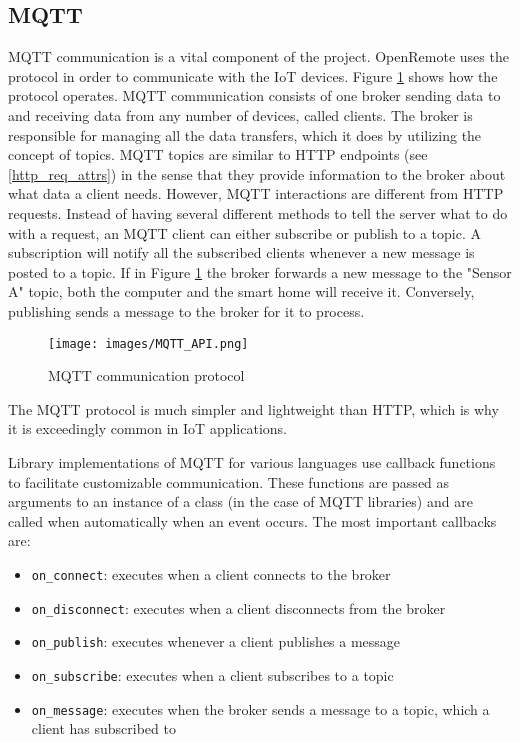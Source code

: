 \subsection{MQTT}
MQTT communication is a vital component of the project. OpenRemote uses the protocol in order to communicate with the IoT devices. Figure \ref{fig:mqtt_api} shows how the protocol operates. MQTT communication consists of one broker sending data to and receiving data from any number of devices, called clients. The broker is responsible for managing all the data transfers, which it does by utilizing the concept of topics. MQTT topics are similar to HTTP endpoints (see \ref{http_req_attrs}) in the sense that they provide information to the broker about what data a client needs. However, MQTT interactions are different from HTTP requests. Instead of having several different methods to tell the server what to do with a request, an MQTT client can either subscribe or publish to a topic. A subscription will notify all the subscribed clients whenever a new message is posted to a topic. If in Figure \ref{fig:mqtt_api} the broker forwards a new message to the "Sensor A" topic, both the computer and the smart home will receive it. Conversely, publishing sends a message to the broker for it to process.

\begin{figure}[ht]
    \centering
    \texttt{[image: images/MQTT\_API.png]}
    \caption{MQTT communication protocol}
    \label{fig:mqtt_api}
\end{figure}

The MQTT protocol is much simpler and lightweight than HTTP, which is why it is exceedingly common in IoT applications.

Library implementations of MQTT for various languages use callback functions to facilitate customizable communication. These functions are passed as arguments to an instance of a class (in the case of MQTT libraries) and are called when automatically when an event occurs. The most important callbacks are:
\begin{itemize}
    \item \lstinline|on_connect|: executes when a client connects to the broker
    \item \lstinline|on_disconnect|: executes when a client disconnects from the broker
    \item \lstinline|on_publish|: executes whenever a client publishes a message
    \item \lstinline|on_subscribe|: executes when a client subscribes to a topic
    \item \lstinline|on_message|: executes when the broker sends a message to a topic, which a client has subscribed to
\end{itemize}

